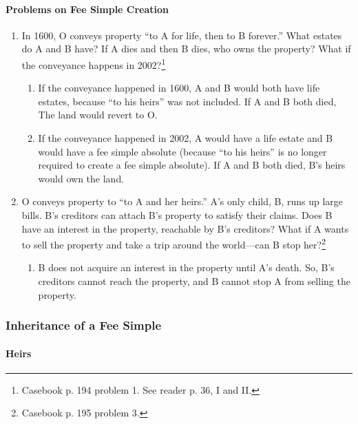 \paragraph{Problems on Fee Simple Creation}

\begin{enumerate}
    \item In 1600, O conveys property ``to A for life, then to B forever.'' 
    What estates do A and B have? If A dies and then B dies, who owns the 
    property? What if the conveyance happens in 2002?\footnote{Casebook p. 194 
    problem 1. See reader p. 36, I and II.}
    \begin{enumerate}
        \item If the conveyance happened in 1600, A and B would both have life 
        estates, because ``to his heirs'' was not included. If A and B both 
        died, The land would revert to O.
        \item If the conveyance happened in 2002, A would have a life estate 
        and B would have a fee simple absolute (because ``to his heirs'' is no 
        longer required to create a fee simple absolute). If A and B both 
        died, B's heirs would own the land.
    \end{enumerate}
    \item O conveys property to ``to A and her heirs.'' A's only child, B, 
    runs up large bills. B's creditors can attach B's property to satisfy 
    their claims. Does B have an interest in the property, reachable by B's 
    creditors? What if A wants to sell the property and take a trip around the 
    world---can B stop her?\footnote{Casebook p. 195 problem 3.}
    \begin{enumerate}
        \item B does not acquire an interest in the property until A's death. 
        So, B's creditors cannot reach the property, and B cannot stop A from 
        selling the property.
    \end{enumerate}
\end{enumerate}

\subsubsection{Inheritance of a Fee Simple}

\paragraph{Heirs}

